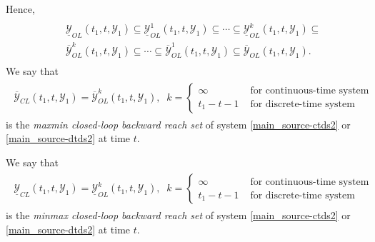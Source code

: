 \documentclass[letterpaper,10pt,english]{sphinxmanual}
\begin{document}
Hence,
\label{main_source:equation-olbrsinclusion}\begin{gather}
\begin{split}\begin{aligned}
&&\underline{{\mathcal Y}}_{OL}(t_1, t, {\mathcal Y}_1) \subseteq \underline{{\mathcal Y}}_{OL}^1(t_1, t, {\mathcal Y}_1) \subseteq \cdots
\subseteq \underline{{\mathcal Y}}_{OL}^k(t_1, t, {\mathcal Y}_1) \subseteq \nonumber \\
&&\overline{{\mathcal Y}}_{OL}^k(t_1, t, {\mathcal Y}_1) \subseteq \cdots \subseteq \overline{{\mathcal Y}}_{OL}^1(t_1, t, {\mathcal Y}_1)
\subseteq \overline{{\mathcal Y}}_{OL}(t_1, t, {\mathcal Y}_1) .
\end{aligned}\end{split}\label{main_source-olbrsinclusion}
\end{gather}
We say that
\label{main_source:equation-maxminclbrs}\begin{gather}
\begin{split}\overline{{\mathcal Y}}_{CL}(t_1, t, {\mathcal Y}_1) = \overline{{\mathcal Y}}_{OL}^k(t_1, t, {\mathcal Y}_1), \;\;
k = \left\{\begin{array}{ll}
\infty & \mbox{ for continuous-time system}\\
t_1-t-1 & \mbox{ for discrete-time system}\end{array}\right.\end{split}\label{main_source-maxminclbrs}
\end{gather}
is the \emph{maxmin closed-loop backward reach set} of system \eqref{main_source-ctds2} or
\eqref{main_source-dtds2} at time $t$.

We say that
\label{main_source:equation-minmaxclbrs}\begin{gather}
\begin{split}\underline{{\mathcal Y}}_{CL}(t_1, t, {\mathcal Y}_1) = \underline{{\mathcal Y}}_{OL}^k(t_1, t, {\mathcal Y}_1), \;\;
k = \left\{\begin{array}{ll}
\infty & \mbox{ for continuous-time system}\\
t_1-t-1 & \mbox{ for discrete-time system}\end{array}\right.\end{split}\label{main_source-minmaxclbrs}
\end{gather}
is the \emph{minmax closed-loop backward reach set} of system \eqref{main_source-ctds2} or
\eqref{main_source-dtds2} at time $t$.
\end{document}
